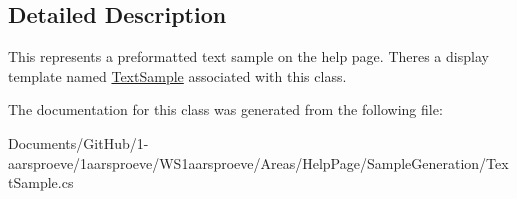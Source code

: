 \subsection{Detailed Description}
This represents a preformatted text sample on the help page. There\textquotesingle{}s a display template named \hyperlink{class_w_s1aarsproeve_1_1_areas_1_1_help_page_1_1_text_sample}{Text\+Sample} associated with this class. 



The documentation for this class was generated from the following file\+:\begin{DoxyCompactItemize}
\item 
Documents/\+Git\+Hub/1-\/aarsproeve/1aarsproeve/\+W\+S1aarsproeve/\+Areas/\+Help\+Page/\+Sample\+Generation/Text\+Sample.\+cs\end{DoxyCompactItemize}
